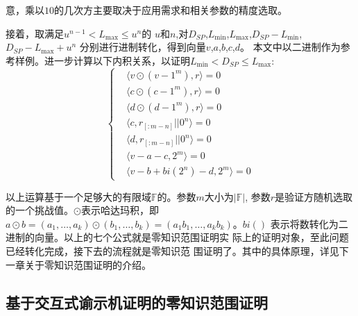 \documentclass[zihao=-4]{ctexart}
\begin{document}
意，乘以$10$的几次方主要取决于应用需求和相关参数的精度选取。\par
接着，取满足$u^{n-1}<L_{\max}\leq u^n$的
$u$和$n$,对$D_{SP}$,$L_{\min}$,$L_{\max}$,$D_{SP}-L_{\min}$,$D_{SP}-L_{\max}+u^n$
分别进行进制转化，得到向量$v$,$a$,$b$,$c$,$d$。
本文中以二进制作为参考样例。进一步计算以下内积关系，以证明$L_{\min}< D_{SP}\leq L_{\max}$:
\begin{equation}
  \begin{cases}
    &\langle v\odot(v-1^m),r\rangle=0\\
    &\langle c\odot(c-1^m),r\rangle=0\\
    &\langle d\odot(d-1^m),r\rangle=0\\
    &\langle c,r_{[:m-n]}||0^n\rangle=0\\
    &\langle d,r_{[:m-n]}||0^n\rangle=0\\
    &\langle v-a-c,2^m\rangle=0\\
    &\langle v-b+bi(2^n)-d,2^m\rangle=0
  \end{cases}
\end{equation}
\par
以上运算基于一个足够大的有限域$\mathbb{F}$的。参数$m$大小为$|\mathbb{F}|$,
参数$r$是验证方随机选取的一个挑战值。$\odot$表示哈达玛积，即
$a\odot b=(a_1,\ldots,a_k)\odot(b_1,\ldots,b_k)=(a_1b_1,\ldots,a_kb_k)$。$bi()$
表示将数转化为二进制的向量。以上的七个公式就是零知识范围证明实
际上的证明对象，至此问题已经转化完成，接下去的流程就是零知识范
围证明了。其中的具体原理，详见下一章关于零知识范围证明的介绍。

\subsection{基于交互式谕示机证明的零知识范围证明}
\end{document}
